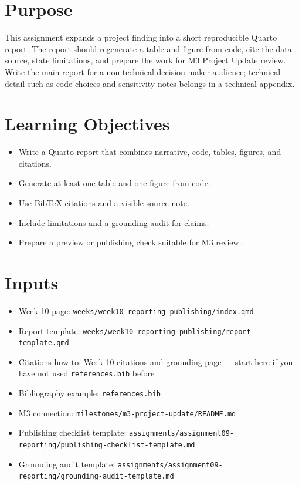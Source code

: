 \documentclass[
  letterpaper,
  DIV=11,
  numbers=noendperiod,
  oneside]{scrreprt}
\providecommand{\tightlist}{%
  \setlength{\itemsep}{0pt}\setlength{\parskip}{0pt}}
\begin{document}
\section{Purpose}\label{purpose-11}

This assignment expands a project finding into a short reproducible
Quarto report. The report should regenerate a table and figure from
code, cite the data source, state limitations, and prepare the work for
M3 Project Update review. Write the main report for a non-technical
decision-maker audience; technical detail such as code choices and
sensitivity notes belongs in a technical appendix.

\section{Learning Objectives}\label{learning-objectives-10}

\begin{itemize}
\tightlist
\item
  Write a Quarto report that combines narrative, code, tables, figures,
  and citations.
\item
  Generate at least one table and one figure from code.
\item
  Use BibTeX citations and a visible source note.
\item
  Include limitations and a grounding audit for claims.
\item
  Prepare a preview or publishing check suitable for M3 review.
\end{itemize}

\section{Inputs}\label{inputs-10}

\begin{itemize}
\tightlist
\item
  Week 10 page: \texttt{weeks/week10-reporting-publishing/index.qmd}
\item
  Report template:
  \texttt{weeks/week10-reporting-publishing/report-template.qmd}
\item
  Citations how-to: \hyperref[citations-and-grounding]{Week 10 citations
  and grounding page} --- start here if you have not used
  \texttt{references.bib} before
\item
  Bibliography example: \texttt{references.bib}
\item
  M3 connection: \texttt{milestones/m3-project-update/README.md}
\item
  Publishing checklist template:
  \texttt{assignments/assignment09-reporting/publishing-checklist-template.md}
\item
  Grounding audit template:
  \texttt{assignments/assignment09-reporting/grounding-audit-template.md}
\end{itemize}
\end{document}
